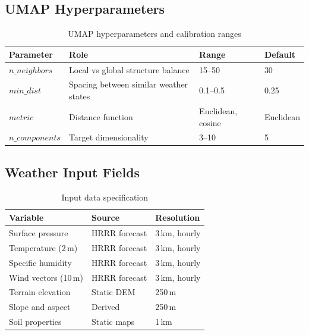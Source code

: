 \documentclass{article}
\begin{document}
\mkminputs

\subsection{UMAP Hyperparameters}

\begin{table}[H]
\centering
\begin{tabular}{llll}
    \toprule
    \textbf{Parameter} & \textbf{Role} & \textbf{Range} & \textbf{Default} \\
    \midrule
    $n\_neighbors$  & Local vs global structure balance       & 15--50  & 30 \\
    $min\_dist$     & Spacing between similar weather states  & 0.1--0.5 & 0.25 \\
    $metric$        & Distance function                       & Euclidean, cosine & Euclidean \\
    $n\_components$ & Target dimensionality                   & 3--10   & 5 \\
    \bottomrule
\end{tabular}
\caption{UMAP hyperparameters and calibration ranges}
\label{tab:umap_params}
\end{table}

\subsection{Weather Input Fields}
\begin{table}[H]
\centering
\begin{tabular}{lll}
    \toprule
    \textbf{Variable} & \textbf{Source} & \textbf{Resolution} \\
    \midrule
    Surface pressure         & HRRR forecast & 3\,km, hourly \\
    Temperature (2\,m)       & HRRR forecast & 3\,km, hourly \\
    Specific humidity        & HRRR forecast & 3\,km, hourly \\
    Wind vectors (10\,m)     & HRRR forecast & 3\,km, hourly \\
    Terrain elevation        & Static DEM    & 250\,m \\
    Slope and aspect         & Derived       & 250\,m \\
    Soil properties          & Static maps   & 1\,km \\
    \bottomrule
\end{tabular}
\caption{Input data specification}
\label{tab:inputs}
\end{table}
\end{document}
